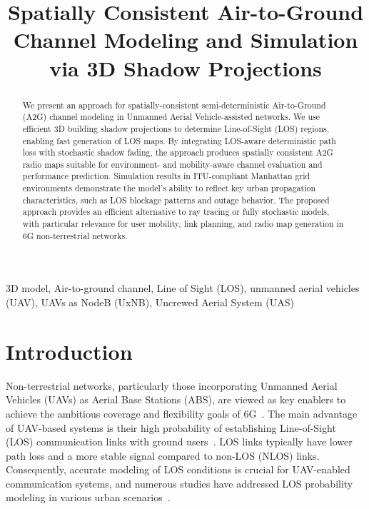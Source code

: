 \documentclass[10pt,conference]{IEEEtran}
\begin{document}
\title{Spatially Consistent Air-to-Ground Channel Modeling and Simulation via 3D Shadow Projections}

\author{    
}


\maketitle
\begin{abstract}
We present an approach for spatially-consistent semi-deterministic Air-to-Ground (A2G) channel modeling in Unmanned Aerial Vehicle-assisted networks. We use efficient 3D building shadow projections to determine Line-of-Sight (LOS) regions, enabling fast generation of LOS maps. By integrating LOS-aware deterministic path loss with stochastic shadow fading, the approach produces spatially consistent A2G radio maps suitable for environment- and mobility-aware channel evaluation and performance prediction. Simulation results in ITU-compliant Manhattan grid environments demonstrate the model’s ability to reflect key urban propagation characteristics, such as LOS blockage patterns and outage behavior. The proposed approach provides an efficient alternative to ray tracing or fully stochastic models, with particular relevance for user mobility, link planning, and radio map generation in 6G non-terrestrial networks.
\end{abstract}

\begin{IEEEkeywords}
3D model, Air-to-ground channel, Line of Sight (LOS), unmanned aerial vehicles (UAV), UAVs as NodeB (UxNB), Uncrewed Aerial System (UAS)
\end{IEEEkeywords}


\section{Introduction}

Non-terrestrial networks, particularly those incorporating Unmanned Aerial Vehicles (UAVs) as Aerial Base Stations (ABS), are viewed as key enablers to achieve the ambitious coverage and flexibility goals of 6G~\cite{Akyildiz2020_6G}. The main advantage of UAV-based systems is their high probability of establishing Line-of-Sight (LOS) communication links with ground users~\cite{Vinogradov2018tut}. LOS links typically have lower path loss and a more stable signal compared to non-LOS (NLOS) links. Consequently, accurate modeling of LOS conditions is crucial for UAV-enabled communication systems, and numerous studies have addressed LOS probability modeling in various urban scenarios~\cite{Vinogradov2018tut,Saboor2024model,3GPPntn,saboorWCNC}.
\end{document}
